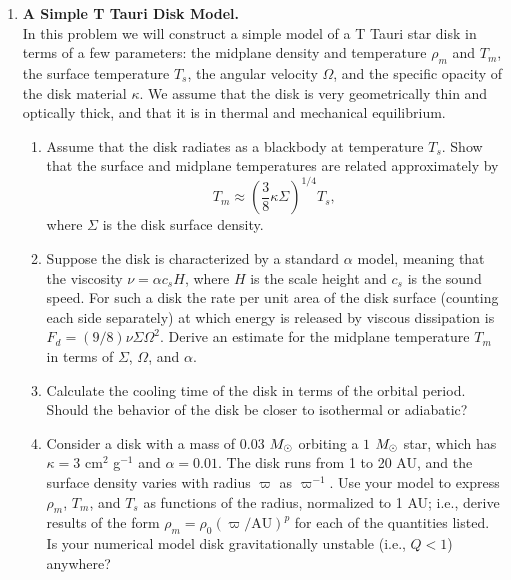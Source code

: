 \begin{enumerate}
\item {\bf A Simple T Tauri Disk Model.}\\
In this problem we will construct a simple model of a T Tauri star disk in terms of a few parameters: the midplane density and temperature $\rho_m$ and $T_m$, the surface temperature $T_s$, the angular velocity $\Omega$, and the specific opacity of the disk material $\kappa$. We assume that the disk is very geometrically thin and optically thick, and that it is in thermal and mechanical equilibrium.
\begin{enumerate}
\item Assume that the disk radiates as a blackbody at temperature $T_s$. Show that the surface and midplane temperatures are related approximately by
\begin{displaymath}
T_m \approx \left(\frac{3}{8}\kappa\Sigma\right)^{1/4} T_s,
\end{displaymath}
where $\Sigma$ is the disk surface density.
\item Suppose the disk is characterized by a standard $\alpha$ model, meaning that the viscosity $\nu=\alpha c_s H$, where $H$ is the scale height and $c_s$ is the sound speed. For such a disk the rate per unit area of the disk surface (counting each side separately) at which energy is released by viscous dissipation is $F_d=(9/8) \nu \Sigma \Omega^2$. Derive an estimate for the midplane temperature $T_m$ in terms of $\Sigma$, $\Omega$, and $\alpha$.
\item Calculate the cooling time of the disk in terms of the orbital period. Should the behavior of the disk be closer to isothermal or adiabatic?
\item Consider a disk with a mass of $0.03$ $M_{\odot}$ orbiting a $1$ $M_{\odot}$ star, which has $\kappa=3$ cm$^2$ g$^{-1}$ and $\alpha=0.01$. The disk runs from 1 to 20 AU, and the surface density varies with radius $\varpi$ as $\varpi^{-1}$. Use your model to express $\rho_m$, $T_m$, and $T_s$ as functions of the radius, normalized to 1 AU; i.e., derive results of the form $\rho_m = \rho_0 (\varpi/\mathrm{AU})^p$ for each of the quantities listed. Is your numerical model disk gravitationally unstable (i.e., $Q<1$) anywhere?
\end{enumerate}

\end{enumerate}
